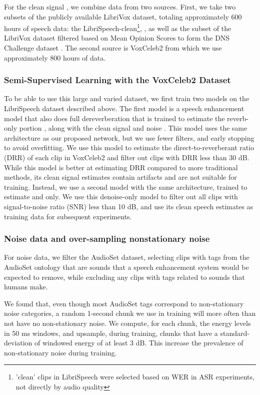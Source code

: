 \documentclass[english]{article}
\begin{document}
For the clean signal , we combine data from two sources. First, we take two subsets of the publicly available LibriVox dataset, totaling approximately 600 hours of speech data: the LibriSpeech-clean\footnote{'clean' clips in LibriSpeech were selected based on WER in ASR experiments, not directly by audio quality}, \cite{librispeech}, as well as the subset of the LibriVox dataset filtered based on Mean Opinion Scores to form the DNS Challenge dataset \cite{dnschallenge}. The second source is VoxCeleb2 from which we use approximately 800 hours of data.

\subsubsection{Semi-Supervised Learning with the VoxCeleb2 Dataset} To be able to use this large and varied dataset, we first train two models on the LibriSpeech dataset described above. The first model is a speech enhancement model that also does full dereverberation that is trained to estimate the reverb-only portion , along with the clean signal  and noise . This model uses the same architecture as our proposed network, but we use fewer filters, and early stopping to avoid overfitting. We use this model to estimate the direct-to-reverberant ratio (DRR) of each clip in VoxCeleb2 and filter out clips with DRR less than 30 dB. While this model is better at estimating DRR compared to more traditional methods, its clean signal estimates contain artifacts and are not suitable for training. Instead, we use a second model with the same architecture, trained to estimate  and  only. We use this denoise-only model to filter out all clips with signal-to-noise ratio (SNR) less than 10 dB, and use its clean speech estimates as training data for subsequent experiments. 


\subsubsection{Noise data and over-sampling nonstationary noise} For noise data, we filter the AudioSet dataset, selecting clips with tags from the AudioSet ontology that are sounds that a speech enhancement system would be expected to remove, while excluding any clips with tags related to sounds that humans make. 

We found that, even though most AudioSet tags correspond to non-stationary noise categories, a random 1-second chunk we use in training will more often than not have no non-stationary noise. We compute, for each chunk, the energy levels in 50 ms windows, and upsample, during training, chunks that have a standard-deviation of windowed energy of at least 3 dB. This increase the prevalence of non-stationary noise during training. 
\end{document}
